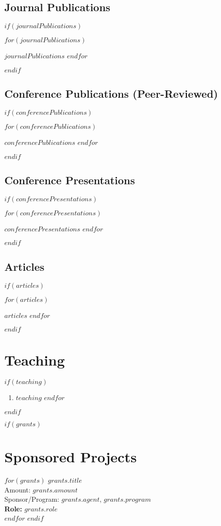 \documentclass[$fontsize$, a4paper]{article}
\newcommand{\note}[1]{\marginnote{\footnotesize #1}}
\def\labelprefix{}
\begin{document}
\subsection*{Journal Publications}
$if(journalPublications)$
{\def\labelprefix{J}%
\begin{etaremune}
$for(journalPublications)$
\item $journalPublications$
$endfor$
\end{etaremune}
}
$endif$

\subsection*{Conference Publications (Peer-Reviewed)}
$if(conferencePublications)$
{\def\labelprefix{C}%
\begin{etaremune}
$for(conferencePublications)$
\item $conferencePublications$
$endfor$
\end{etaremune}
}
$endif$

\subsection*{Conference Presentations}
$if(conferencePresentations)$
{\def\labelprefix{P}%
\begin{etaremune}
$for(conferencePresentations)$
\item $conferencePresentations$
$endfor$
\end{etaremune}
}
$endif$

\subsection*{Articles}
$if(articles)$
{\def\labelprefix{A}%
\begin{etaremune}
$for(articles)$
\item $articles$
$endfor$
\end{etaremune}
}
$endif$

\section*{Teaching}
$if(teaching)$
\begin{enumerate}
$for(teaching)$
\item $teaching$
$endfor$
\end{enumerate}
$endif$

$if(grants)$
\section*{Sponsored Projects}
\noindent
$for(grants)$
\note{$grants.period$}\textbf{$grants.title$}\\
Amount: $grants.amount$\\
Sponsor/Program: $grants.agent$, $grants.program$\\
\textbf{Role: } $grants.role$\\[.2cm]
$endfor$
$endif$
\end{document}
